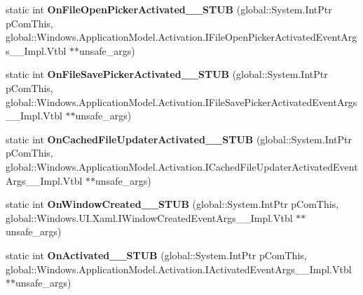 \begin{DoxyCompactItemize}
\item 
\mbox{\label{struct_windows_1_1_u_i_1_1_xaml_1_1_i_application_overrides_____impl_1_1_vtbl_aeedfddd71f49afd2dded76968a4140d6}} 
static int {\bfseries On\+File\+Open\+Picker\+Activated\+\_\+\+\_\+\+S\+T\+UB} (global\+::\+System.\+Int\+Ptr p\+Com\+This, global\+::\+Windows.\+Application\+Model.\+Activation.\+I\+File\+Open\+Picker\+Activated\+Event\+Args\+\_\+\+\_\+\+Impl.\+Vtbl $\ast$$\ast$unsafe\+\_\+args)
\item 
\mbox{\label{struct_windows_1_1_u_i_1_1_xaml_1_1_i_application_overrides_____impl_1_1_vtbl_a69f9ef1a1651ef58133a816b423a9270}} 
static int {\bfseries On\+File\+Save\+Picker\+Activated\+\_\+\+\_\+\+S\+T\+UB} (global\+::\+System.\+Int\+Ptr p\+Com\+This, global\+::\+Windows.\+Application\+Model.\+Activation.\+I\+File\+Save\+Picker\+Activated\+Event\+Args\+\_\+\+\_\+\+Impl.\+Vtbl $\ast$$\ast$unsafe\+\_\+args)
\item 
\mbox{\label{struct_windows_1_1_u_i_1_1_xaml_1_1_i_application_overrides_____impl_1_1_vtbl_a621778ff6817d2ea373e2f5a1f42bd9b}} 
static int {\bfseries On\+Cached\+File\+Updater\+Activated\+\_\+\+\_\+\+S\+T\+UB} (global\+::\+System.\+Int\+Ptr p\+Com\+This, global\+::\+Windows.\+Application\+Model.\+Activation.\+I\+Cached\+File\+Updater\+Activated\+Event\+Args\+\_\+\+\_\+\+Impl.\+Vtbl $\ast$$\ast$unsafe\+\_\+args)
\item 
\mbox{\label{struct_windows_1_1_u_i_1_1_xaml_1_1_i_application_overrides_____impl_1_1_vtbl_a9afed578176233dce858655f137f848e}} 
static int {\bfseries On\+Window\+Created\+\_\+\+\_\+\+S\+T\+UB} (global\+::\+System.\+Int\+Ptr p\+Com\+This, global\+::\+Windows.\+U\+I.\+Xaml.\+I\+Window\+Created\+Event\+Args\+\_\+\+\_\+\+Impl.\+Vtbl $\ast$$\ast$unsafe\+\_\+args)
\item 
\mbox{\label{struct_windows_1_1_u_i_1_1_xaml_1_1_i_application_overrides_____impl_1_1_vtbl_ad7464db51bad65770e0db03c4757bea2}} 
static int {\bfseries On\+Activated\+\_\+\+\_\+\+S\+T\+UB} (global\+::\+System.\+Int\+Ptr p\+Com\+This, global\+::\+Windows.\+Application\+Model.\+Activation.\+I\+Activated\+Event\+Args\+\_\+\+\_\+\+Impl.\+Vtbl $\ast$$\ast$unsafe\+\_\+args)
$$
\end{DoxyCompactItemize}
